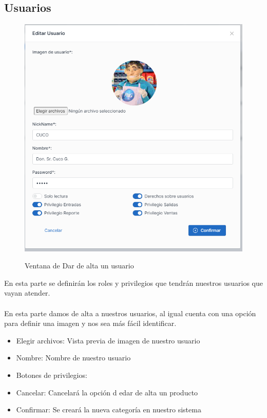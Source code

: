 \documentclass[a4paper,DIV=12]{scrreprt}
\begin{document}
\subsection{Usuarios}

	\begin{figure}[!htb]
		\centering
		\includegraphics[scale=0.4]{ALTAUSUARIO.PNG}\\
		\caption{Ventana de Dar de alta un usuario}
	\end{figure}
	En esta parte se definirán los roles y privilegios que tendrán nuestros usuarios que vayan atender.\\
	\\ En esta parte damos de alta a nuestros usuarios, al igual cuenta con una opción para definir una imagen y nos sea más fácil identificar.
\begin{itemize}
	\item Elegir archivos: Vista previa de imagen de nuestro usuario
	\item Nombre: Nombre de nuestro usuario
	\item Botones de privilegios:
	\item Cancelar: Cancelará la opción d edar de alta un producto
	\item Confirmar: Se creará la nueva categoría en nuestro sistema
\end{itemize}
	
\end{document}
